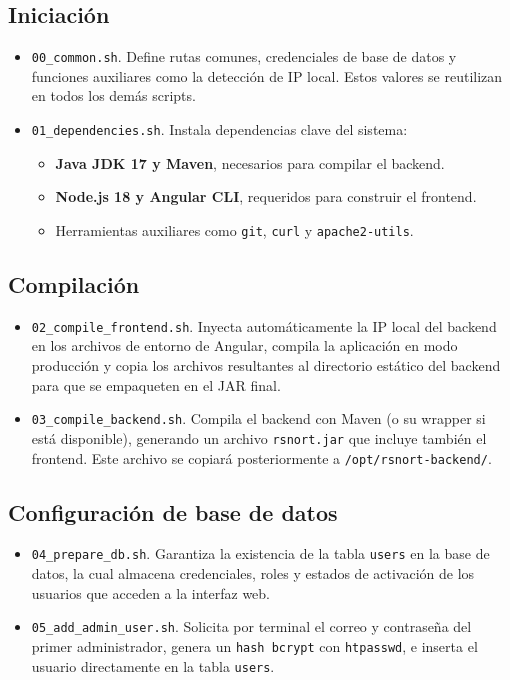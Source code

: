 \documentclass[11pt,a4paper,twoside]{report}
\begin{document}
\subsection*{Iniciación}

\begin{itemize}
	\item \texttt{00\_common.sh}. Define rutas comunes, credenciales de base de datos y funciones auxiliares como la detección de IP local. Estos valores se reutilizan en todos los demás scripts.
	
	\item \texttt{01\_dependencies.sh}. Instala dependencias clave del sistema:
	\begin{itemize}
		\item \textbf{Java JDK 17 y Maven}, necesarios para compilar el backend.
		\item \textbf{Node.js 18 y Angular CLI}, requeridos para construir el frontend.
		\item Herramientas auxiliares como \texttt{git}, \texttt{curl} y \texttt{apache2-utils}.
	\end{itemize}
\end{itemize}

\subsection*{Compilación}

\begin{itemize}
	\item \texttt{02\_compile\_frontend.sh}. Inyecta automáticamente la IP local del backend en los archivos de entorno de Angular, compila la aplicación en modo producción y copia los archivos resultantes al directorio estático del backend para que se empaqueten en el JAR final.
	
	\item \texttt{03\_compile\_backend.sh}. Compila el backend con Maven (o su wrapper si está disponible), generando un archivo \texttt{rsnort.jar} que incluye también el frontend. Este archivo se copiará posteriormente a \texttt{/opt/rsnort-backend/}.
\end{itemize}

\subsection*{Configuración de base de datos}

\begin{itemize}
	\item \texttt{04\_prepare\_db.sh}. Garantiza la existencia de la tabla \texttt{users} en la base de datos, la cual almacena credenciales, roles y estados de activación de los usuarios que acceden a la interfaz web.
	
	\item \texttt{05\_add\_admin\_user.sh}. Solicita por terminal el correo y contraseña del primer administrador, genera un \texttt{hash bcrypt} con \texttt{htpasswd}, e inserta el usuario directamente en la tabla \texttt{users}.
\end{itemize}
\end{document}
